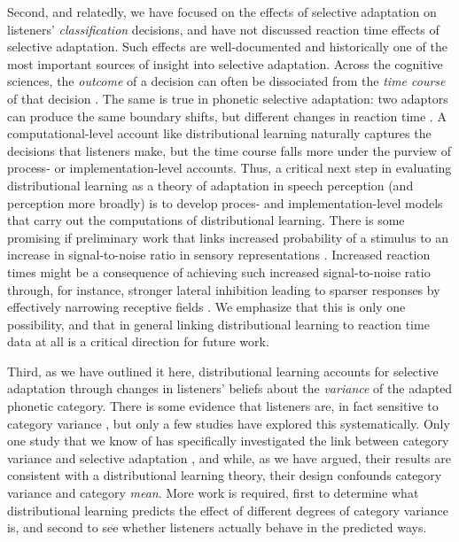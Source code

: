 Second, and relatedly, we have focused on the effects of selective adaptation on listeners' \emph{classification} decisions, and have not discussed reaction time effects of selective adaptation.  Such effects are well-documented \cite{Samuel1986,Samuel1996} and historically one of the most important sources of insight into selective adaptation.  Across the cognitive sciences, the \emph{outcome} of a decision can often be dissociated from the \emph{time course} of that decision \autocite[see, e.g., the related discussion for lexical selection in speech production; ][]{Mahon2007,Oppenheim2010}.  The same is true in phonetic selective adaptation: two adaptors can produce the same boundary shifts, but different changes in reaction time \cite{Samuel1996}.  A computational-level account like distributional learning naturally captures the decisions that listeners make, but the time course falls more under the purview of process- or implementation-level accounts.  Thus, a critical next step in evaluating distributional learning as a theory of adaptation in speech perception (and perception more broadly) is to develop proces- and implementation-level models that carry out the computations  of distributional learning.  There is some promising if preliminary work that links increased probability of a stimulus to an increase in signal-to-noise ratio in sensory representations \cite{Stocker2006,Wei2012}.  Increased reaction times might be a consequence of achieving such increased signal-to-noise ratio through, for instance, stronger lateral inhibition leading to sparser responses by effectively narrowing receptive fields \cite{Gardner2004}.  We emphasize that this is only one possibility, and that in general linking distributional learning to reaction time data at all is a critical direction for future work.

Third, as we have outlined it here, distributional learning accounts for selective adaptation through changes in listeners' beliefs about the \emph{variance} of the adapted phonetic category.  There is some evidence that listeners are, in fact sensitive to category variance \cite{Clayards2008,Cole1977,Newman2001,Schreiber2013}, but only a few studies have explored this systematically.  Only one study that we know of has specifically investigated the link between category variance and selective adaptation \cite{Cole1977}, and while, as we have argued, their results are consistent with a distributional learning theory, their design confounds category variance and category \emph{mean}.  More work is required, first to determine what distributional learning predicts the effect of different degrees of category variance is, and second to see whether listeners actually behave in the predicted ways.

